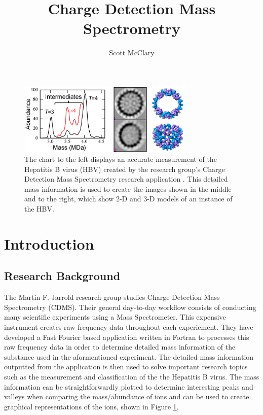 \documentclass[9pt,twocolumn,twoside]{../../styles/osajnl}
\title{Charge Detection Mass Spectrometry}
\author[1,*]{Scott McClary}
\affil[1]{School of Informatics and Computing, Bloomington, IN 47408, U.S.A.}
\affil[*]{Corresponding authors: scmcclar@indiana.edu}
\begin{document}
\maketitle

\begin{figure}
\centering
\includegraphics[height=1.35in, width=3.3in]{images/hbvassembly}
\caption{The chart to the left displays an accurate measurement of the
  Hepatitis B virus (HBV) created by the research group's Charge
  Detection Mass Spectrometry research application \cite{247}. This
  detailed mass information is used to create the images shown in the
  middle and to the right, which show 2-D and 3-D models of an
  instance of the HBV.}
\label{fig:hbvassembly}
\end{figure}

\section{Introduction} \label{introduction}
\subsection{Research Background} \label{research-background}
The Martin F. Jarrold research group studies Charge Detection Mass
Spectrometry (CDMS). Their general day-to-day workflow consists of
conducting many scientific experiments using a Mass Spectrometer. This
expensive instrument creates raw frequency data throughout each
experiement. They have developed a Fast Fourier based application
written in Fortran to processes this raw frequency data in order to
determine detailed mass information of the substance used in the
aformentioned experiment. The detailed mass information outputted from
the application is then used to solve important research topics such
as the measurement and classification of the the Hepatitis B
virus. The mass information can be straightforwardly plotted to
determine interesting peaks and valleys when comparing the
mass/abundance of ions and can be used to create graphical
representations of the ions, shown in Figure \ref{fig:hbvassembly}.
\end{document}
